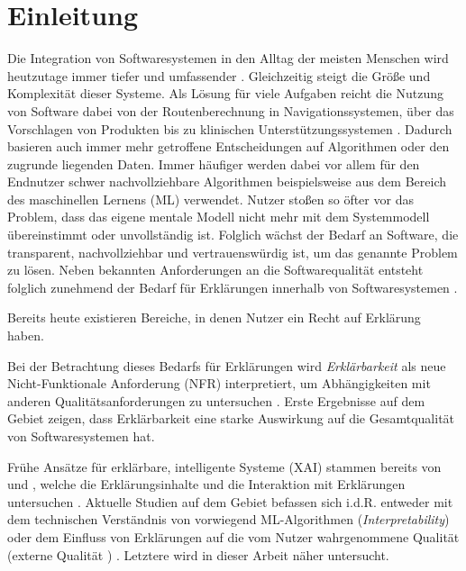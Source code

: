 \chapter{Einleitung}

Die Integration von Softwaresystemen in den Alltag der meisten Menschen wird heutzutage immer tiefer und umfassender \cite{carvalho2020developers}.  Gleichzeitig steigt die Größe und Komplexität dieser Systeme. Als Lösung für viele Aufgaben reicht die Nutzung von Software dabei von der Routenberechnung in Navigationssystemen, über das Vorschlagen von Produkten bis zu klinischen Unterstützungssystemen \cite{chazette2020explainability, tintarev2015explaining, cypko2017guide}. Dadurch basieren auch immer mehr getroffene Entscheidungen auf Algorithmen oder den zugrunde liegenden Daten. Immer häufiger werden dabei vor allem für den Endnutzer schwer nachvollziehbare Algorithmen beispielsweise aus dem Bereich des maschinellen Lernens (ML) verwendet. Nutzer stoßen so öfter vor das Problem, dass das eigene mentale Modell nicht mehr mit dem Systemmodell übereinstimmt oder unvollständig ist. Folglich wächst der Bedarf an Software, die transparent, nachvollziehbar und vertrauenswürdig ist, um das genannte Problem zu lösen. Neben bekannten Anforderungen an die Softwarequalität \cite{international2011iso} entsteht folglich zunehmend der Bedarf für Erklärungen innerhalb von Softwaresystemen \cite{chazette_end-users_nodate}.

Bereits heute existieren Bereiche, in denen Nutzer ein \glqq Recht auf Erklärung\grqq{} haben.

Bei der Betrachtung dieses Bedarfs für Erklärungen wird \textit{Erklärbarkeit} als neue Nicht-Funktionale Anforderung (NFR) interpretiert, um Abhängigkeiten mit anderen Qualitätsanforderungen zu untersuchen \cite{chazette2020explainability, kohl_explainability_2019}. Erste Ergebnisse auf dem Gebiet zeigen, dass Erklärbarkeit eine starke Auswirkung auf die Gesamtqualität von Softwaresystemen hat.

Frühe Ansätze für erklärbare, intelligente Systeme (XAI) stammen bereits von \citeauthor{byrne1991construction} und \citeauthor{cawsey1991generating}, welche die Erklärungsinhalte \cite{byrne1991construction} und die Interaktion mit Erklärungen untersuchen \cite{cawsey1991generating}. Aktuelle Studien auf dem Gebiet befassen sich i.d.R. entweder mit dem technischen Verständnis von vorwiegend ML-Algorithmen (\textit{Interpretability}) \cite{gilpin_explaining_2018, fong_interpretable_2017, samek_towards_2019} oder dem Einfluss von Erklärungen auf die vom Nutzer wahrgenommene Qualität (externe Qualität \cite{international2011iso}) \cite{nunes_systematic_2017,kouki_user_2017,chazette_end-users_nodate}. Letztere wird in dieser Arbeit näher untersucht.

